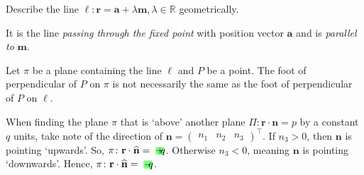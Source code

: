 \documentclass[oneside]{book}
\newcommand{\highlight}[2][red!50]{\mathpalette{\highlightwithstyle[#1]}{#2}}
\newcommand{\highlightwithstyle}[3][red!50]{
  \begingroup                         %
    \sbox0{$\mathsurround 0pt #2#3$}%
    \setlength{\fboxsep}{.5pt}        %
    \sbox2{\hspace{-.5pt}%
      \colorbox{#1}{\usebox0}%
    }%
    \dp2=\dp0 \ht2=\ht0 \wd2=\wd0     %
    \box2                             %
  \endgroup                           %
}
\begin{document}
\begin{note}
  Describe the line \(\ell\colon\mathbf{r}=\mathbf{a}+\lambda\mathbf{m},\lambda\in \mathbb{R}\) geometrically.
  \begin{center}
    \parbox{0.9\textwidth}{
      It is the line \emph{passing through the fixed point} with position vector \(\mathbf{a}\) and is \emph{parallel to} \(\mathbf{m}\). 
    }
  \end{center}
\end{note}
\begin{note}
  Let \(\pi\) be a plane containing the line \(\ell\) and \(P\) be a point. The foot of perpendicular of \(P\) on \(\pi\) is not necessarily the same as the foot of perpendicular of \(P\) on \(\ell\). 
\end{note}
\begin{note}
  When finding the plane \(\pi\) that is `above' another plane \(\Pi\colon \mathbf{r}\cdot \mathbf{n}=p\) by a constant \(q\) units, take note of the direction of \(\mathbf{n}=
  \begin{pmatrix}
    n_1 & n_2 & n_3
  \end{pmatrix}^{\top}\). If \(n_3>0\), then \(\mathbf{n}\) is pointing `upwards'. So, \(\pi\colon \mathbf{r}\cdot\widehat{\mathbf{n}}=\highlight[green!50]{+}q\). Otherwise \(n_3<0\), meaning \(\mathbf{n}\) is pointing `downwards'. Hence, \(\pi\colon \mathbf{r}\cdot\widehat{\mathbf{n}}=\highlight[green!50]{-}q\).
\end{note}
\end{document}
